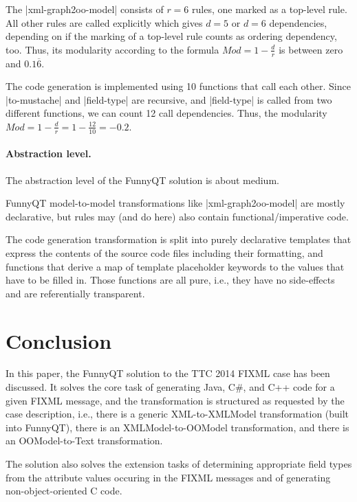 \documentclass[a4paper]{article}
\newcommand{\code}{\clojureinline}
\begin{document}
The \code|xml-graph2oo-model| consists of \(r=6\)
rules, one marked as a top-level rule.  All other rules are called explicitly
which gives \(d=5\)
or \(d=6\)
dependencies, depending on if the marking of a top-level rule counts as
ordering dependency, too.  Thus, its modularity according to the formula
\(Mod = 1 - \frac{d}{r}\) is between zero and \(0.1\overline{6}\).

The code generation is implemented using 10 functions that call each other.
Since \code|to-mustache| and \code|field-type| are recursive, and
\code|field-type| is called from two different functions, we can count 12 call
dependencies.  Thus, the modularity
\(Mod = 1 - \frac{d}{r} = 1 - \frac{12}{10} = -0.2\).


\paragraph{Abstraction level.}
\label{sec:abstraction-level}

The abstraction level of the FunnyQT solution is about medium.

FunnyQT model-to-model transformations like \code|xml-graph2oo-model| are
mostly declarative, but rules may (and do here) also contain
functional/imperative code.

The code generation transformation is split into purely declarative templates
that express the contents of the source code files including their formatting,
and functions that derive a map of template placeholder keywords to the values
that have to be filled in.  Those functions are all pure, i.e., they have no
side-effects and are referentially transparent.


\section{Conclusion}
\label{sec:conclusion}

In this paper, the FunnyQT solution to the TTC 2014 FIXML case has been
discussed.  It solves the core task of generating Java, C\#, and C++ code for a
given FIXML message, and the transformation is structured as requested by the
case description, i.e., there is a generic XML-to-XMLModel transformation
(built into FunnyQT), there is an XMLModel-to-OOModel transformation, and there
is an OOModel-to-Text transformation.

The solution also solves the extension tasks of determining appropriate field
types from the attribute values occuring in the FIXML messages and of
generating non-object-oriented C code.
\end{document}
